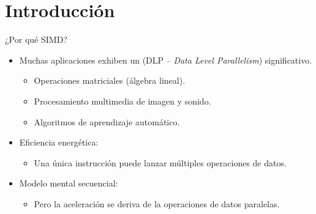 \section{Introducción}

\begin{frame}[t]{¿Por qué SIMD?}
\begin{itemize}
  \item Muchas aplicaciones exhiben un 
        (DLP -- \emph{Data Level Parallelism}) significativo.
    \begin{itemize}
      \item Operaciones matriciales (álgebra lineal).
      \item Procesamiento multimedia de imagen y sonido.
      \item Algoritmos de aprendizaje automático.
    \end{itemize}

  \item Eficiencia energética:
    \begin{itemize}
      \item Una única instrucción puede lanzar múltiples operaciones de datos.
    \end{itemize}

  \item Modelo mental secuencial:
    \begin{itemize}
      \item Pero la aceleración se deriva de la operaciones de datos paralelas.
    \end{itemize}
\end{itemize}
\end{frame}


